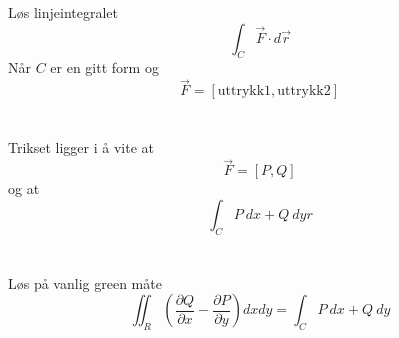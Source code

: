 Løs linjeintegralet
$$\int_C \vec{F} \cdot d\vec{r}$$
Når $C$ er en gitt form og
$$\vec{F} = [\text{uttrykk1}, \text{uttrykk2}]$$
\\\\
Trikset ligger i å vite at
$$\vec{F} = [P,Q]$$
og at
$$\int_C P\: dx + Q\: dy{r}$$
\\\\
Løs på vanlig green måte
$$\iint_R \left( \frac{\partial Q}{\partial x}
                - \frac{\partial P}{\partial y} \right) dxdy
  = \int_C P\: dx + Q\: dy$$
